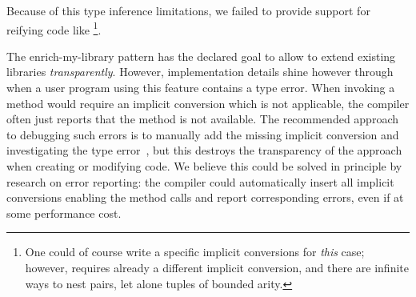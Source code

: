 Because of this type inference limitations, we failed to provide support for reifying code like \footnote{One could of course write a specific implicit conversions for \emph{this} case; however,  requires already a different implicit conversion, and there are infinite ways to nest pairs, let alone tuples of bounded arity.}.



%
%


The enrich-my-library pattern has the declared goal to allow to extend existing libraries \emph{transparently}. However, implementation details shine however through when a user program using this feature contains a type error. When invoking a method would require an implicit conversion which is not applicable, the compiler often just reports that the method is not available. The recommended approach to debugging such errors is to manually add the missing implicit conversion and investigating the type error~\citep[Ch.~21.8]{Odersky11book}, but this destroys the transparency of the approach when creating or modifying code.
 We believe this could be solved in principle by research on error reporting: the compiler could automatically insert all implicit conversions enabling the method calls and report corresponding errors, even if at some performance cost.


